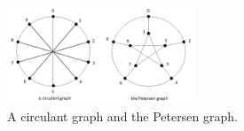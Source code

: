 \begin{figure}
  \centering
  \includegraphics[width=0.5\textwidth]{fig-1}
  \caption{A circulant graph and the Petersen graph.}
\end{figure}  